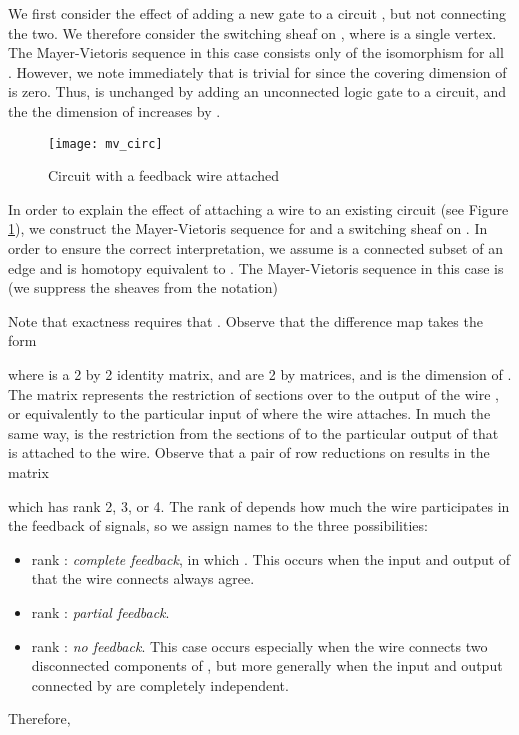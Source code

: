 \documentclass{amsart}
\theoremstyle{plain}
\theoremstyle{definition}
\begin{document}
We first consider the effect of adding a new gate  to a circuit
, but not connecting the two.  We therefore consider the switching
sheaf  on , where  is a single vertex.
The Mayer-Vietoris sequence in this case consists only of the
isomorphism  for all .  However, we note immediately that
 is trivial for  since the covering dimension
of  is zero.  Thus,  is unchanged by adding an unconnected
logic gate to a circuit, and the the dimension of  increases by
.  

\begin{figure}
\begin{center}
\texttt{[image: mv\_circ]}
\caption{Circuit  with a feedback wire  attached}
\label{mv_circ_fig}
\end{center}
\end{figure}

In order to explain the effect of attaching a wire  to an existing
circuit  (see Figure \ref{mv_circ_fig}), we construct the
Mayer-Vietoris sequence for  and a switching sheaf on
.  In order to ensure the correct interpretation, we
assume  is a connected subset of an edge and  is homotopy
equivalent to .  The Mayer-Vietoris sequence in this case is (we
suppress the sheaves from the notation)

Note that exactness requires that .  Observe that the difference map takes the form

where  is a 2 by 2 identity matrix,  and  are 2 by  matrices, and  is the dimension of .  The matrix  represents the restriction of sections over  to the output of the wire , or equivalently to the particular input of  where the wire attaches.  In much the same way,  is the restriction from the sections of  to the particular output of  that is attached to the wire.  Observe that a pair of row reductions on  results in the matrix

which has rank 2, 3, or 4.  The rank of  depends how much the wire participates in the feedback of signals, so we assign names to the three possibilities:
\begin{itemize}
\item rank : {\it complete feedback}, in which .  This occurs when the input and output of  that the wire connects always agree.
\item rank : {\it partial feedback}.
\item rank : {\it no feedback}.  This case occurs especially when the wire  connects two disconnected components of , but more generally when the input and output connected by  are completely independent.
\end{itemize}
Therefore,
\end{document}

